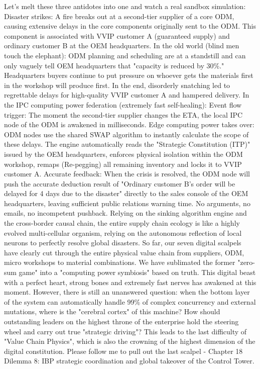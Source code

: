 \documentclass[11pt,a4paper]{article}
\begin{document}
Let’s melt these three antidotes into one and watch a real sandbox simulation: Disaster strikes: A fire breaks out at a second-tier supplier of a core ODM, causing extensive delays in the core components originally sent to the ODM. This component is associated with VVIP customer A (guaranteed supply) and ordinary customer B at the OEM headquarters. In the old world (blind men touch the elephant): ODM planning and scheduling are at a standstill and can only vaguely tell OEM headquarters that "capacity is reduced by 30\%." Headquarters buyers continue to put pressure on whoever gets the materials first in the workshop will produce first. In the end, disorderly snatching led to regrettable delays for high-quality VVIP customer A and hampered delivery. In the IPC computing power federation (extremely fast self-healing): Event flow trigger: The moment the second-tier supplier changes the ETA, the local IPC node of the ODM is awakened in milliseconds. Edge computing power takes over: ODM nodes use the shared SWAP algorithm to instantly calculate the scope of these delays. The engine automatically reads the "Strategic Constitution (ITP)" issued by the OEM headquarters, enforces physical isolation within the ODM workshop, remaps (Re-pegging) all remaining inventory and locks it to VVIP customer A. Accurate feedback: When the crisis is resolved, the ODM node will push the accurate deduction result of "Ordinary customer B's order will be delayed for 4 days due to the disaster" directly to the sales console of the OEM headquarters, leaving sufficient public relations warning time. No arguments, no emails, no incompetent pushback. Relying on the sinking algorithm engine and the cross-border causal chain, the entire supply chain ecology is like a highly evolved multi-cellular organism, relying on the autonomous reflection of local neurons to perfectly resolve global disasters. So far, our seven digital scalpels have clearly cut through the entire physical value chain from suppliers, ODM, micro workshops to material combinations. We have sublimated the former "zero-sum game" into a "computing power symbiosis" based on truth. This digital beast with a perfect heart, strong bones and extremely fast nerves has awakened at this moment. However, there is still an unanswered question: when the bottom layer of the system can automatically handle 99\% of complex concurrency and external mutations, where is the "cerebral cortex" of this machine? How should outstanding leaders on the highest throne of the enterprise hold the steering wheel and carry out true "strategic driving"? This leads to the last difficulty of "Value Chain Physics", which is also the crowning of the highest dimension of the digital constitution. Please follow me to pull out the last scalpel - Chapter 18 Dilemma 8: IBP strategic coordination and global takeover of the Control Tower.
\end{document}
